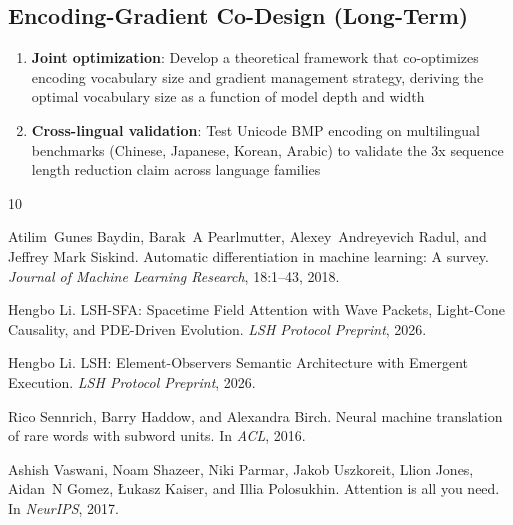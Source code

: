 \documentclass{article}
\begin{document}
\subsection{Encoding-Gradient Co-Design (Long-Term)}

\begin{enumerate}
\item \textbf{Joint optimization}: Develop a theoretical framework that co-optimizes encoding vocabulary size and gradient management strategy, deriving the optimal vocabulary size as a function of model depth and width
\item \textbf{Cross-lingual validation}: Test Unicode BMP encoding on multilingual benchmarks (Chinese, Japanese, Korean, Arabic) to validate the 3x sequence length reduction claim across language families
\end{enumerate}


\begin{thebibliography}{10}

Atilim~Gunes Baydin, Barak~A Pearlmutter, Alexey~Andreyevich Radul, and Jeffrey Mark Siskind.
\newblock Automatic differentiation in machine learning: A survey.
\newblock \emph{Journal of Machine Learning Research}, 18:1--43, 2018.

Hengbo Li.
\newblock LSH-SFA: Spacetime Field Attention with Wave Packets, Light-Cone Causality, and PDE-Driven Evolution.
\newblock \emph{LSH Protocol Preprint}, 2026.

Hengbo Li.
\newblock LSH: Element-Observers Semantic Architecture with Emergent Execution.
\newblock \emph{LSH Protocol Preprint}, 2026.

Rico Sennrich, Barry Haddow, and Alexandra Birch.
\newblock Neural machine translation of rare words with subword units.
\newblock In \emph{ACL}, 2016.

Ashish Vaswani, Noam Shazeer, Niki Parmar, Jakob Uszkoreit, Llion Jones, Aidan~N Gomez, {\L}ukasz Kaiser, and Illia Polosukhin.
\newblock Attention is all you need.
\newblock In \emph{NeurIPS}, 2017.

\end{thebibliography}
\end{document}
